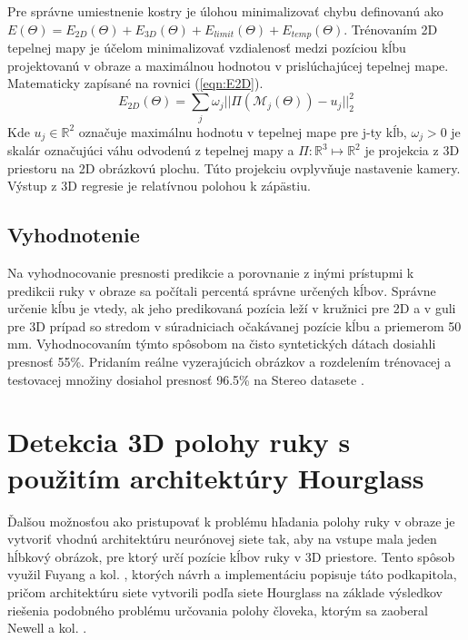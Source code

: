 Pre správne umiestnenie kostry je úlohou minimalizovať chybu definovanú ako $E(\Theta) = E_{2D}(\Theta) + E_{3D}(\Theta) + E_{limit}(\Theta) + E_{temp}(\Theta) $. Trénovaním 2D tepelnej mapy je účelom minimalizovať vzdialenosť medzi pozíciou kĺbu projektovanú v obraze a maximálnou hodnotou v prislúchajúcej tepelnej mape. Matematicky zapísané na rovnici (\ref{eqn:E2D}).
\begin{equation}\label{eqn:E2D}
    E_{2D}(\Theta) = \sum_j \omega_j ||\Pi(\mathcal{M}_j(\Theta)) - u_j||_2^2
\end{equation}
Kde $u_j \in \mathbb{R}^2$ označuje maximálnu hodnotu v tepelnej mape pre j-ty kĺb, $\omega_j > 0$ je skalár označujúci váhu odvodenú z tepelnej mapy a $\Pi:\mathbb{R}^3 \mapsto \mathbb{R}^2$ je projekcia z 3D priestoru na 2D obrázkovú plochu. Túto projekciu ovplyvňuje nastavenie kamery. Výstup z 3D regresie je relatívnou polohou k zápästiu.

\subsection{Vyhodnotenie}

Na vyhodnocovanie presnosti predikcie a porovnanie z inými prístupmi k predikcii ruky v obraze sa počítali percentá správne určených kĺbov. Správne určenie kĺbu je vtedy, ak jeho predikovaná pozícia leží v kružnici pre 2D a v guli pre 3D prípad so stredom v súradniciach očakávanej pozície kĺbu a priemerom 50 mm. Vyhodnocovaním týmto spôsobom na čisto syntetických dátach dosiahli presnosť 55\%. Pridaním reálne vyzerajúcich obrázkov a rozdelením trénovacej a testovacej množiny dosiahol presnosť 96.5\% na Stereo datasete \cite{DBLP:journals/corr/ZhangJCQXY16}.

\section{Detekcia 3D polohy ruky s použitím architektúry Hourglass}\label{chpt:hourglass}

Ďalšou možnosťou ako pristupovať k problému hľadania polohy ruky v obraze je vytvoriť vhodnú architektúru neurónovej siete tak, aby na vstupe mala jeden hĺbkový obrázok, pre ktorý určí pozície kĺbov ruky v 3D priestore. Tento spôsob využil Fuyang a kol. \cite{DBLP:journals/corr/hourglass}, ktorých návrh a implementáciu popisuje táto podkapitola, pričom architektúru siete vytvorili podľa siete Hourglass na základe výsledkov riešenia podobného problému určovania polohy človeka, ktorým sa zaoberal Newell a kol. \cite{DBLP:journals/corr/NewellYD16}.

